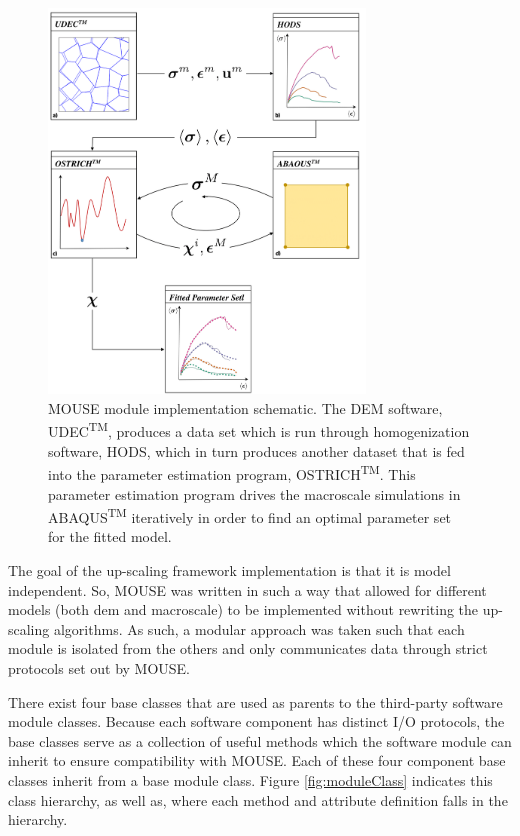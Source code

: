 \begin{figure}[p]
\begin{center}
\includegraphics[width=0.75\textwidth]{figures/Chapter4/UpScalingFlowChart}
\caption{{\label{fig:upscalingflowchart} MOUSE module implementation schematic. The DEM software, UDEC\textsuperscript{TM}, produces a data set which is run through homogenization software, HODS, which in turn produces another dataset that is fed into the parameter estimation program, OSTRICH\textsuperscript{TM}. This parameter estimation program drives the macroscale simulations in ABAQUS\textsuperscript{TM} iteratively in order to find an optimal parameter set for the fitted model.%
}}
\end{center}
\end{figure}

The goal of the up-scaling framework implementation is that it is model independent. So, MOUSE was written in such a way that allowed for different models (both \acrshort{dem} and macroscale) to be implemented without rewriting the up-scaling algorithms. As such, a modular approach was taken such that each module is isolated from the others and only communicates data through strict protocols set out by MOUSE.

There exist four base classes that are used as parents to the third-party software module classes. Because each software component has distinct I/O protocols, the base classes serve as a collection of useful methods which the software module can inherit to ensure compatibility with MOUSE. Each of these four component base classes inherit from a base module class. Figure \ref{fig:moduleClass} indicates this class hierarchy, as well as, where each method and attribute definition falls in the hierarchy.

